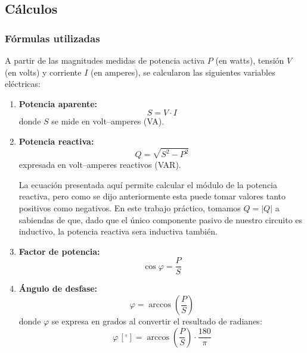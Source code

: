 \documentclass{article}
\begin{document}
        \subsection{Cálculos} \label{sec:Cálculos}

            \subsubsection*{Fórmulas utilizadas}

            A partir de las magnitudes medidas de potencia activa $P$ (en watts), 
            tensión $V$ (en volts) y corriente $I$ (en amperes), se calcularon las 
            siguientes variables eléctricas:

            \begin{enumerate}
                \item \textbf{Potencia aparente:}
                \[
                    S = V \cdot I
                \]
                donde $S$ se mide en volt–amperes (VA).

                \item \textbf{Potencia reactiva:}
                \[
                    Q = \sqrt{S^{2} - P^{2}}
                \]
                expresada en volt–amperes reactivos (VAR). \par
                
                La ecuación presentada aquí permite calcular el módulo de la potencia reactiva, pero como se dijo
                anteriormente esta puede tomar valores tanto positivos como negativos. En este trabajo práctico, 
                tomamos $Q=|Q|$ a sabiendas de que, dado que el único componente pasivo de nuestro circuito es inductivo, 
                la potencia reactiva sera inductiva también.

                \item \textbf{Factor de potencia:}
                \[
                    \cos \varphi = \frac{P}{S}
                \]

                \item \textbf{Ángulo de desfase:}
                \[
                    \varphi = \arccos\left( \frac{P}{S} \right)
                \]
                donde $\varphi$ se expresa en grados al convertir el resultado de 
                radianes:
                \[
                    \varphi \,[^\circ] = \arccos\left( \frac{P}{S} \right) \cdot 
                    \frac{180}{\pi}
                \]
            \end{enumerate}
\end{document}
